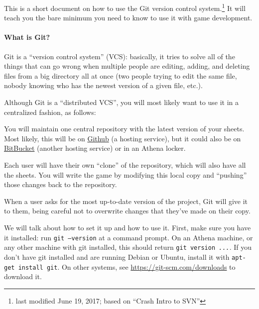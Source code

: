 \documentclass[green]{testgame}
\begin{document}
\newcommand{\ter}[1]{\fbox{\parbox{6.5in}{{\tt #1}}}}


This is a short document on how to use the Git version control
system.\footnote{last modified June 19, 2017; based on ``Crash Intro to SVN''} It will teach you the
bare minimum you need to know to use it with game development.

\paragraph*{What is Git?}

Git is a ``version control system'' (VCS): basically,
it tries to solve all of the things that can go wrong when multiple
people are editing, adding, and deleting files from a big directory all
at once (two people trying to edit the same file, nobody knowing who
has the newest version of a given file, etc.).

Although Git is a ``distributed VCS'', you will most likely want to use it in a centralized fashion, as follows:


\begin{itemz}[]

\item You will maintain one central repository with the latest version of your sheets. Most likely, this will be on \href{https://github.com}{Github} (a hosting service), but it could also be on \href{https://bitbucket.org/}{BitBucket} (another hosting service) or in an Athena locker.

\item Each user will have their own ``clone'' of the repository, which will also have all the sheets. You will write the game by modifying this local copy and ``pushing'' those changes back to the repository.

\item When a user asks for the most up-to-date version of the project, Git will give it to them, being careful not to overwrite changes that they've made on their copy.

\end{itemz}

We will talk about how to set it up and how to use it. First, make sure you have it installed: run \texttt{git --version} at a command prompt. On an Athena machine, or any other machine with git installed, this should return \texttt{git version \textit{...}}. If you don't have git installed and are running Debian or Ubuntu, install it with \texttt{apt-get install git}. On other systems, see \url{https://git-scm.com/downloads} to download it.
\end{document}
